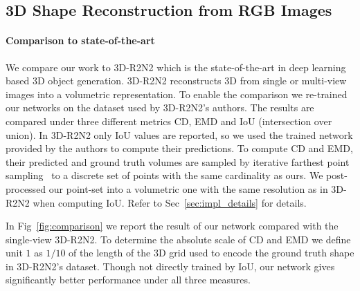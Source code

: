 \subsection{3D Shape Reconstruction from RGB Images}


\label{sec:exp:rgb}
\paragraph{Comparison to state-of-the-art}
We compare our work to 3D-R2N2\cite{choy20163d} which is the state-of-the-art in deep learning based 3D object generation. 3D-R2N2 reconstructs 3D from single or multi-view images into a volumetric representation. To enable the comparison we re-trained our networks on the dataset used by 3D-R2N2's authors. The results are compared under three different metrics CD, EMD and IoU (intersection over union). %
In 3D-R2N2 only IoU values are reported, so we used the trained network provided by the authors to compute their predictions. To compute CD and EMD, their predicted and ground truth volumes are sampled by iterative farthest point sampling~\cite{eldar1997farthest} to a discrete set of points with the same cardinality as ours. We post-processed our point-set into a volumetric one with the same resolution as in 3D-R2N2 when computing IoU. Refer to Sec~\ref{sec:impl_details} for details.

In Fig~\ref{fig:comparison} we report the result of our network compared with the single-view 3D-R2N2. To determine the absolute scale of CD and EMD we define unit $1$ as $1/10$ of the length of the 3D grid used to encode the ground truth shape in 3D-R2N2's dataset. Though not directly trained by IoU, our network gives significantly better performance under all three measures. 

